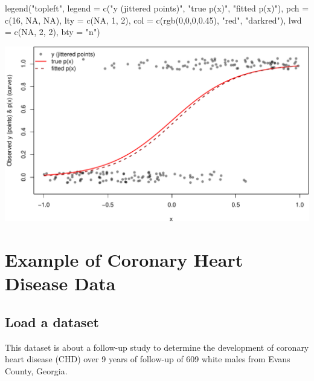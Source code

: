 \documentclass[
  letterpaper,
]{scrbook}
\newenvironment{Shaded}{\begin{snugshade}}{\end{snugshade}}
\newcommand{\AttributeTok}[1]{\textcolor[rgb]{0.40,0.45,0.13}{#1}}
\newcommand{\ConstantTok}[1]{\textcolor[rgb]{0.56,0.35,0.01}{#1}}
\newcommand{\DecValTok}[1]{\textcolor[rgb]{0.68,0.00,0.00}{#1}}
\newcommand{\FloatTok}[1]{\textcolor[rgb]{0.68,0.00,0.00}{#1}}
\newcommand{\FunctionTok}[1]{\textcolor[rgb]{0.28,0.35,0.67}{#1}}
\newcommand{\NormalTok}[1]{\textcolor[rgb]{0.00,0.23,0.31}{#1}}
\newcommand{\StringTok}[1]{\textcolor[rgb]{0.13,0.47,0.30}{#1}}
\begin{document}
\begin{Shaded}
\begin{Highlighting}[]
\FunctionTok{legend}\NormalTok{(}\StringTok{"topleft"}\NormalTok{,}
       \AttributeTok{legend =} \FunctionTok{c}\NormalTok{(}\StringTok{"y (jittered points)"}\NormalTok{, }\StringTok{"true p(x)"}\NormalTok{, }\StringTok{"fitted p(x)"}\NormalTok{),}
       \AttributeTok{pch    =} \FunctionTok{c}\NormalTok{(}\DecValTok{16}\NormalTok{, }\ConstantTok{NA}\NormalTok{, }\ConstantTok{NA}\NormalTok{),}
       \AttributeTok{lty    =} \FunctionTok{c}\NormalTok{(}\ConstantTok{NA}\NormalTok{, }\DecValTok{1}\NormalTok{, }\DecValTok{2}\NormalTok{),}
       \AttributeTok{col    =} \FunctionTok{c}\NormalTok{(}\FunctionTok{rgb}\NormalTok{(}\DecValTok{0}\NormalTok{,}\DecValTok{0}\NormalTok{,}\DecValTok{0}\NormalTok{,}\FloatTok{0.45}\NormalTok{), }\StringTok{"red"}\NormalTok{, }\StringTok{"darkred"}\NormalTok{),}
       \AttributeTok{lwd    =} \FunctionTok{c}\NormalTok{(}\ConstantTok{NA}\NormalTok{, }\DecValTok{2}\NormalTok{, }\DecValTok{2}\NormalTok{),}
       \AttributeTok{bty    =} \StringTok{"n"}\NormalTok{)}
\end{Highlighting}
\end{Shaded}

\includegraphics{unit4-lr/logistic_files/figure-pdf/unnamed-chunk-2-1.pdf}

\section{Example of Coronary Heart Disease
Data}\label{example-of-coronary-heart-disease-data}

\subsection{Load a dataset}\label{load-a-dataset}

This dataset is about a follow-up study to determine the development of
coronary heart disease (CHD) over 9 years of follow-up of 609 white
males from Evans County, Georgia.
\end{document}
